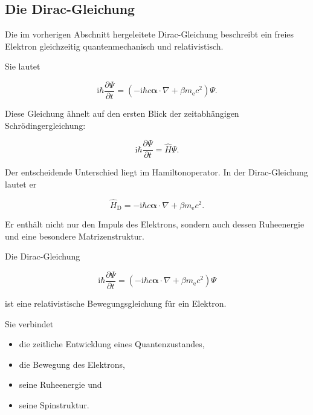 
\subsection{Die Dirac-Gleichung}
\label{subsec:diracgleichung}

Die im vorherigen Abschnitt hergeleitete Dirac-Gleichung%
 beschreibt ein freies Elektron gleichzeitig
quantenmechanisch und relativistisch.

Sie lautet

\begin{equation}
	\mathrm{i}\hbar
	\frac{\partial\Psi}{\partial t}
	=
	\left(
	-\mathrm{i}\hbar c
	\boldsymbol{\alpha}\cdot\nabla
	+
	\beta m_{\mathrm e}c^2
	\right)
	\Psi.
	\label{eq:diracgleichung_hamiltonform_kapitel07}
\end{equation}

Diese Gleichung ähnelt auf den ersten Blick der zeitabhängigen
Schrödingergleichung:

\begin{equation}
	\mathrm{i}\hbar
	\frac{\partial\Psi}{\partial t}
	=
	\hat{H}\Psi.
\end{equation}

Der entscheidende Unterschied liegt im Hamiltonoperator. In der
Dirac-Gleichung lautet er

\begin{equation}
	\hat{H}_{\mathrm D}
	=
	-\mathrm{i}\hbar c
	\boldsymbol{\alpha}\cdot\nabla
	+
	\beta m_{\mathrm e}c^2.
	\label{eq:dirac_hamiltonoperator_kapitel07}
\end{equation}

Er enthält nicht nur den Impuls des Elektrons, sondern auch dessen
Ruheenergie und eine besondere Matrizenstruktur.

\begin{PhysicsBox}
	\label{box:diracgleichung_kapitel07}
	
	Die Dirac-Gleichung
	
	\begin{equation}
		\mathrm{i}\hbar
		\frac{\partial\Psi}{\partial t}
		=
		\left(
		-\mathrm{i}\hbar c
		\boldsymbol{\alpha}\cdot\nabla
		+
		\beta m_{\mathrm e}c^2
		\right)
		\Psi
	\end{equation}
	
	ist eine relativistische Bewegungsgleichung für ein Elektron.
	
	Sie verbindet
	
	\begin{itemize}
		\item die zeitliche Entwicklung eines Quantenzustandes,
		\item die Bewegung des Elektrons,
		\item seine Ruheenergie und
		\item seine Spinstruktur.
	\end{itemize}
\end{PhysicsBox}

